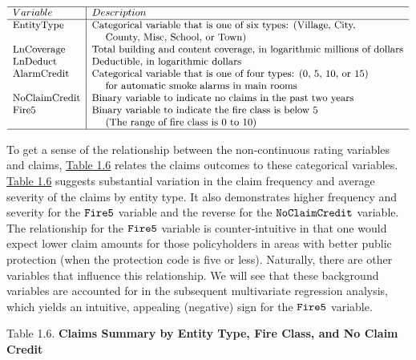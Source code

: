 \documentclass[
]{book}
\begin{document}
\[{\small \begin{matrix}
\begin{array}{ l | l}
\hline
Variable    & Description \\
\hline
\text{EntityType}   & \text{Categorical variable that is one of six types:  (Village, City,} \\
& ~~~~ \text{County, Misc, School, or Town)} \\
\text{LnCoverage}   & \text{Total building and content coverage, in logarithmic millions of dollars}\\
\text{LnDeduct}     & \text{Deductible, in logarithmic dollars} \\
\text{AlarmCredit}  & \text{Categorical variable that is one of four types:  (0, 5, 10, or 15)} \\
 &  ~~~~   \text{for automatic smoke alarms in main rooms} \\
\text{NoClaimCredit}    & \text{Binary variable to indicate no claims in the past two years} \\
\text{Fire5 }           & \text{Binary variable to indicate the fire class is below 5} \\
& ~~~~ \text{(The range of fire class is 0 to 10)} \\
\hline
\end{array}
\end{matrix}}\]

To get a sense of the relationship between the non-continuous rating variables and claims, \href{../docs/ChapIntro.html\#tab:1.6}{Table 1.6} relates the claims outcomes to these
categorical variables. \href{../docs/ChapIntro.html\#tab:1.6}{Table 1.6} suggests substantial variation in the claim frequency and average severity of the claims by
entity type. It also demonstrates higher frequency and severity for the
\({\tt Fire5}\) variable and the reverse for the \({\tt NoClaimCredit}\) variable.
The relationship for the \({\tt Fire5}\) variable is counter-intuitive in that
one would expect lower claim amounts for those policyholders in areas
with better public protection (when the protection code is five or
less). Naturally, there are other variables that influence this
relationship. We will see that these background variables are accounted
for in the subsequent multivariate regression analysis, which yields an
intuitive, appealing (negative) sign for the \({\tt Fire5}\) variable.

Table 1.6. \textbf{Claims Summary by Entity Type, Fire Class, and No Claim Credit}
\end{document}
